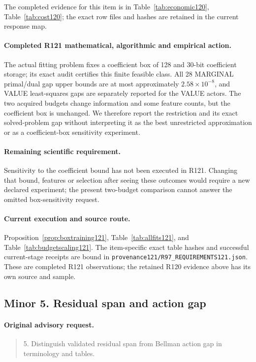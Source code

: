 The completed evidence for this item is in Table~\ref{tab:economic120}, Table~\ref{tab:cost120}; the exact row files and hashes are retained in the current response map.

\paragraph{Completed R121 mathematical, algorithmic and empirical action.}
The actual fitting problem fixes a coefficient box of 128 and 30-bit coefficient storage; its exact audit certifies this finite feasible class. All 28 MARGINAL primal/dual gap upper bounds are at most approximately $2.58\times10^{-8}$, and VALUE least-squares gaps are separately reported for the VALUE actors. The two acquired budgets change information and some feature counts, but the coefficient box is unchanged. We therefore report the restriction and its exact solved-problem gap without interpreting it as the best unrestricted approximation or as a coefficient-box sensitivity experiment.

\paragraph{Remaining scientific requirement.}
Sensitivity to the coefficient bound has not been executed in R121. Changing that bound, features or selection after seeing these outcomes would require a new declared experiment; the present two-budget comparison cannot answer the omitted box-sensitivity request.

\paragraph{Current execution and source route.}
Proposition~\ref{prop:boxtraining121}, Table~\ref{tab:allfits121}, and Table~\ref{tab:budgetscaling121}.
The item-specific exact table hashes and successful current-stage receipts are bound in \nolinkurl{provenance121/R97_REQUIREMENTS121.json}. These are completed R121 observations; the retained R120 evidence above has its own source and sample.

\subsection{Minor 5. Residual span and action gap}
\label{response121:minor-5}

\paragraph{Original advisory request.}
\begin{quote}
5. Distinguish validated residual span from Bellman action gap in terminology and tables.
\end{quote}

